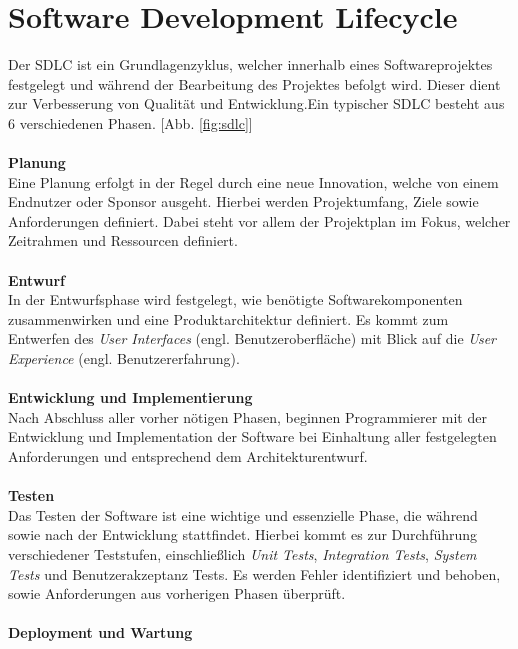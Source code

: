 \section{Software Development Lifecycle}
Der SDLC ist ein Grundlagenzyklus, welcher innerhalb eines Softwareprojektes festgelegt und während der Bearbeitung des Projektes befolgt wird. \cite*{SoftwareDevelopmentLife} Dieser dient zur Verbesserung von Qualität und Entwicklung.Ein typischer SDLC besteht aus 6 verschiedenen Phasen. [Abb. \ref{fig:sdlc}]\\\\
\textbf{Planung}\\[0.2cm]
Eine Planung erfolgt in der Regel durch eine neue Innovation, welche von einem Endnutzer oder Sponsor ausgeht. \cite*{tikySoftwareDevelopmentLife} Hierbei werden Projektumfang, Ziele sowie Anforderungen definiert. Dabei steht vor allem der Projektplan im Fokus, welcher Zeitrahmen und Ressourcen definiert. \cite*{hossainSoftwareDevelopmentLife2023}\\\\
\textbf{Entwurf}\\[0.2cm]
In der Entwurfsphase wird festgelegt, wie benötigte Softwarekomponenten zusammenwirken und eine Produktarchitektur definiert. Es kommt zum Entwerfen des \textit{User Interfaces} (engl. Benutzeroberfläche) mit Blick auf die \textit{User Experience} (engl. Benutzererfahrung). \cite*{hossainSoftwareDevelopmentLife2023}\\\\
\textbf{Entwicklung und Implementierung}\\[0.2cm]
Nach Abschluss aller vorher nötigen Phasen, beginnen Programmierer mit der Entwicklung und Implementation der Software bei Einhaltung aller festgelegten Anforderungen und entsprechend dem Architekturentwurf. \cite*{tikySoftwareDevelopmentLife} \\\\
\textbf{Testen}\\[0.2cm]
Das Testen der Software ist eine wichtige und essenzielle Phase, die während sowie nach der Entwicklung stattfindet. Hierbei kommt es zur Durchführung verschiedener Teststufen, einschließlich \textit{Unit Tests}, \textit{Integration Tests}, \textit{System Tests} und Benutzerakzeptanz Tests. Es werden Fehler identifiziert und behoben, sowie Anforderungen aus vorherigen Phasen überprüft. \cite*{hossainSoftwareDevelopmentLife2023}\\\\
\textbf{Deployment und Wartung}\\[0.2cm]
